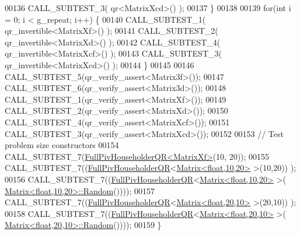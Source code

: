 \begin{DoxyCode}
00136     CALL\_SUBTEST\_3( qr<MatrixXcd>() );
00137   \}
00138 
00139   \textcolor{keywordflow}{for}(\textcolor{keywordtype}{int} i = 0; i < g\_repeat; i++) \{
00140     CALL\_SUBTEST\_1( qr\_invertible<MatrixXf>() );
00141     CALL\_SUBTEST\_2( qr\_invertible<MatrixXd>() );
00142     CALL\_SUBTEST\_4( qr\_invertible<MatrixXcf>() );
00143     CALL\_SUBTEST\_3( qr\_invertible<MatrixXcd>() );
00144   \}
00145 
00146   CALL\_SUBTEST\_5(qr\_verify\_assert<Matrix3f>());
00147   CALL\_SUBTEST\_6(qr\_verify\_assert<Matrix3d>());
00148   CALL\_SUBTEST\_1(qr\_verify\_assert<MatrixXf>());
00149   CALL\_SUBTEST\_2(qr\_verify\_assert<MatrixXd>());
00150   CALL\_SUBTEST\_4(qr\_verify\_assert<MatrixXcf>());
00151   CALL\_SUBTEST\_3(qr\_verify\_assert<MatrixXcd>());
00152 
00153   \textcolor{comment}{// Test problem size constructors}
00154   CALL\_SUBTEST\_7(\hyperlink{group___q_r___module_class_eigen_1_1_full_piv_householder_q_r}{FullPivHouseholderQR<MatrixXf>}(10, 20));
00155   CALL\_SUBTEST\_7((\hyperlink{group___q_r___module_class_eigen_1_1_full_piv_householder_q_r}{FullPivHouseholderQR}<\hyperlink{group___core___module_class_eigen_1_1_matrix}{Matrix<float,10,20>} >(10,20))
      );
00156   CALL\_SUBTEST\_7((\hyperlink{group___q_r___module_class_eigen_1_1_full_piv_householder_q_r}{FullPivHouseholderQR}<\hyperlink{group___core___module_class_eigen_1_1_matrix}{Matrix<float,10,20>} >(
      \hyperlink{group___core___module_class_eigen_1_1_matrix}{Matrix<float,10,20>::Random}())));
00157   CALL\_SUBTEST\_7((\hyperlink{group___q_r___module_class_eigen_1_1_full_piv_householder_q_r}{FullPivHouseholderQR}<\hyperlink{group___core___module_class_eigen_1_1_matrix}{Matrix<float,20,10>} >(20,10))
      );
00158   CALL\_SUBTEST\_7((\hyperlink{group___q_r___module_class_eigen_1_1_full_piv_householder_q_r}{FullPivHouseholderQR}<\hyperlink{group___core___module_class_eigen_1_1_matrix}{Matrix<float,20,10>} >(
      \hyperlink{group___core___module_class_eigen_1_1_matrix}{Matrix<float,20,10>::Random}())));
00159 \}
\end{DoxyCode}
